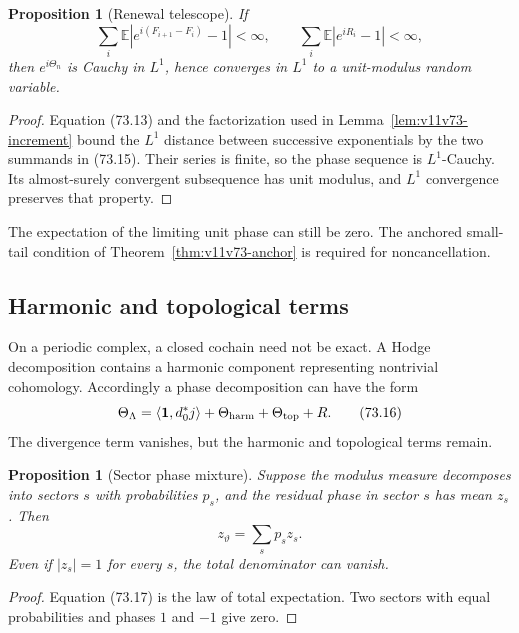 \documentclass[11pt]{article}
\newtheorem{proposition}[theorem]{Proposition}
\begin{document}
\begin{proposition}[Renewal telescope]
\label{prop:v11v73-renewal}
If
\[
 \sum_i{\mathbb E}|e^{i(F_{i+1}-F_i)}-1|<\infty,\qquad
 \sum_i{\mathbb E}|e^{iR_i}-1|<\infty,                       \tag{73.15}
\]
then \(e^{i\Theta_n}\) is Cauchy in \(L^1\), hence converges in
\(L^1\) to a unit-modulus random variable.
\end{proposition}

\begin{proof}
Equation (73.13) and the factorization used in
Lemma~\ref{lem:v11v73-increment} bound the \(L^1\) distance between
successive exponentials by the two summands in (73.15).  Their series
is finite, so the phase sequence is \(L^1\)-Cauchy.  Its almost-surely
convergent subsequence has unit modulus, and \(L^1\) convergence
preserves that property.
\end{proof}

The expectation of the limiting unit phase can still be zero.
The anchored small-tail condition of
Theorem~\ref{thm:v11v73-anchor} is required for noncancellation.

\subsection{Harmonic and topological terms}

On a periodic complex, a closed cochain need not be exact.  A Hodge
decomposition contains a harmonic component representing nontrivial
cohomology.  Accordingly a phase decomposition can have the form
\[
                         \Theta_\Lambda
 =\langle{\bf1},d_0^*j\rangle
       +\Theta_{\rm harm}+\Theta_{\rm top}+R.                 \tag{73.16}
\]
The divergence term vanishes, but the harmonic and topological terms
remain.

\begin{proposition}[Sector phase mixture]
\label{prop:v11v73-sector}
Suppose the modulus measure decomposes into sectors \(s\) with
probabilities \(p_s\), and the residual phase in sector \(s\) has mean
\(z_s\).  Then
\[
                         z_\vartheta=\sum_sp_sz_s.            \tag{73.17}
\]
Even if \(|z_s|=1\) for every \(s\), the total denominator can vanish.
\end{proposition}

\begin{proof}
Equation (73.17) is the law of total expectation.  Two sectors with
equal probabilities and phases \(1\) and \(-1\) give zero.
\end{proof}
\end{document}
